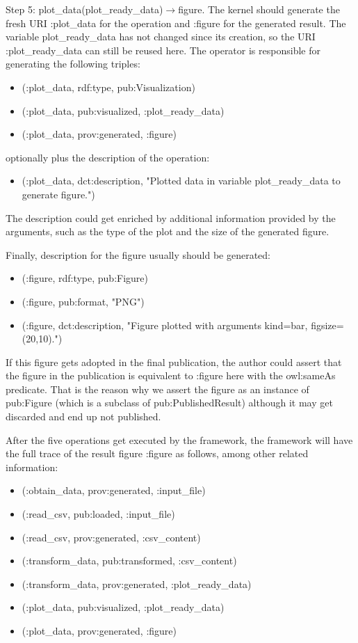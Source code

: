 Step 5: plot\_data(plot\_ready\_data)$\rightarrow$figure. The kernel should generate the fresh URI :plot\_data for the operation and :figure for the generated result. The variable plot\_ready\_data has not changed since its creation, so the URI :plot\_ready\_data can still be reused here. The operator is responsible for generating the following triples:
\begin{itemize}
	\item (:plot\_data, rdf:type, pub:Visualization)
	\item (:plot\_data, pub:visualized, :plot\_ready\_data)
	\item (:plot\_data, prov:generated, :figure)
\end{itemize}
optionally plus the description of the operation:
\begin{itemize}
	\item (:plot\_data, dct:description, "Plotted data in variable plot\_ready\_data to generate figure.")
\end{itemize}
The description could get enriched by additional information provided by the arguments, such as the type of the plot and the size of the generated figure.

Finally, description for the figure usually should be generated:
\begin{itemize}
	\item (:figure, rdf:type, pub:Figure)
	\item (:figure, pub:format, "PNG")
	\item (:figure, dct:description, "Figure plotted with arguments kind=bar, figsize=(20,10).")
\end{itemize}
If this figure gets adopted in the final publication, the author could assert that the figure in the publication is equivalent to :figure here with the owl:sameAs predicate. That is the reason why we assert the figure as an instance of pub:Figure (which is a subclass of pub:PublishedResult) although it may get discarded and end up not published.

After the five operations get executed by the framework, the framework will have the full trace of the result figure :figure as follows, among other related information:
\begin{itemize}
	\item (:obtain\_data, prov:generated, :input\_file)
	\item (:read\_csv, pub:loaded, :input\_file)
	\item (:read\_csv, prov:generated, :csv\_content)
	\item (:transform\_data, pub:transformed, :csv\_content)
	\item (:transform\_data, prov:generated, :plot\_ready\_data)
	\item (:plot\_data, pub:visualized, :plot\_ready\_data)
	\item (:plot\_data, prov:generated, :figure)
\end{itemize}


